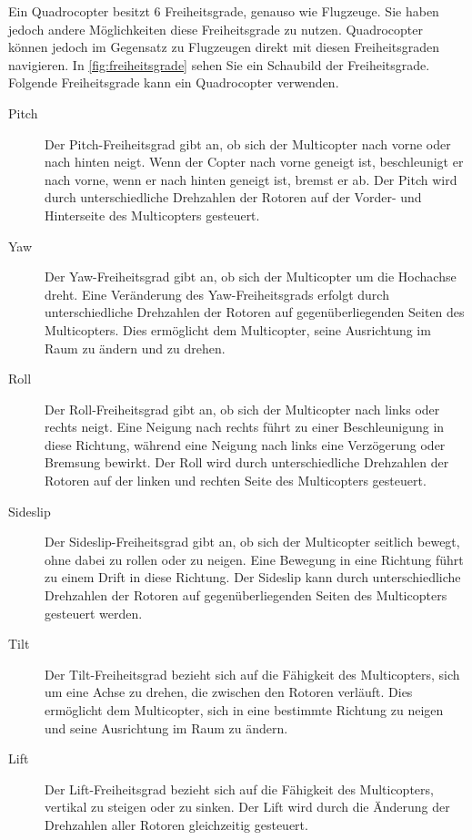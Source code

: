 Ein Quadrocopter besitzt 6 Freiheitsgrade, genauso wie Flugzeuge. Sie haben jedoch andere Möglichkeiten diese Freiheitsgrade zu nutzen.
Quadrocopter können jedoch im Gegensatz zu Flugzeugen direkt mit diesen Freiheitsgraden navigieren. In \ref{fig:freiheitsgrade} sehen Sie ein Schaubild der Freiheitsgrade.
Folgende Freiheitsgrade kann ein Quadrocopter verwenden.

\begin{description}
    \item[Pitch] Der Pitch-Freiheitsgrad gibt an, ob sich der Multicopter nach vorne oder nach hinten neigt. Wenn der Copter nach vorne geneigt ist, beschleunigt er nach vorne, wenn er nach hinten geneigt ist, bremst er ab. Der Pitch wird durch unterschiedliche Drehzahlen der Rotoren auf der Vorder- und Hinterseite des Multicopters gesteuert.
    \item[Yaw] Der Yaw-Freiheitsgrad gibt an, ob sich der Multicopter um die Hochachse dreht. Eine Veränderung des Yaw-Freiheitsgrads erfolgt durch unterschiedliche Drehzahlen der Rotoren auf gegenüberliegenden Seiten des Multicopters. Dies ermöglicht dem Multicopter, seine Ausrichtung im Raum zu ändern und zu drehen.
    \item[Roll] Der Roll-Freiheitsgrad gibt an, ob sich der Multicopter nach links oder rechts neigt. Eine Neigung nach rechts führt zu einer Beschleunigung in diese Richtung, während eine Neigung nach links eine Verzögerung oder Bremsung bewirkt. Der Roll wird durch unterschiedliche Drehzahlen der Rotoren auf der linken und rechten Seite des Multicopters gesteuert.
    \item[Sideslip] Der Sideslip-Freiheitsgrad gibt an, ob sich der Multicopter seitlich bewegt, ohne dabei zu rollen oder zu neigen. Eine Bewegung in eine Richtung führt zu einem Drift in diese Richtung. Der Sideslip kann durch unterschiedliche Drehzahlen der Rotoren auf gegenüberliegenden Seiten des Multicopters gesteuert werden.
    \item[Tilt] Der Tilt-Freiheitsgrad bezieht sich auf die Fähigkeit des Multicopters, sich um eine Achse zu drehen, die zwischen den Rotoren verläuft. Dies ermöglicht dem Multicopter, sich in eine bestimmte Richtung zu neigen und seine Ausrichtung im Raum zu ändern.
    \item[Lift] Der Lift-Freiheitsgrad bezieht sich auf die Fähigkeit des Multicopters, vertikal zu steigen oder zu sinken. Der Lift wird durch die Änderung der Drehzahlen aller Rotoren gleichzeitig gesteuert.    
\end{description}

